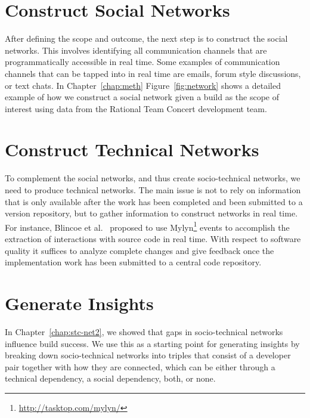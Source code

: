 \section{Construct Social Networks}
After  defining the scope and outcome, the next step is to construct the social networks.
This involves identifying all communication channels that are programmatically accessible in real time.
Some examples of communication channels that can be tapped into in real time are emails, forum style discussions, or text chats.
In Chapter~\ref{chap:meth} Figure~\ref{fig:network} shows a detailed  example of how we construct a social network given a build as the scope of interest using data from the Rational Team Concert development team.

\section{Construct Technical Networks}
To complement the social networks, and thus create socio-technical networks, we need to produce technical networks.
The main issue is not to rely on information that is only available after the work has been completed and been submitted to a version repository, but to gather information to construct networks in real time.
For instance, Blincoe et al.~\cite{blincoe:cscw:2012} proposed to use Mylyn\footnote{\url{http://tasktop.com/mylyn/}} events to accomplish the extraction of interactions with source code in real time.
%
With respect to software quality it suffices to analyze complete changes and give feedback once the implementation work has been submitted to a central code repository.

\section{Generate Insights}
In Chapter~\ref{chap:stc-net2}, we showed that gaps in socio-technical networks influence build success.
We use this as a starting point for generating insights by breaking down socio-technical networks into triples that consist of a developer pair together with how they are connected, which can be either through a technical dependency, a social dependency, both, or none.

